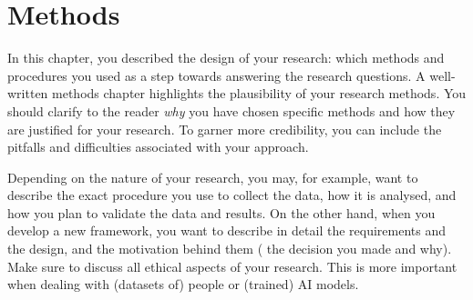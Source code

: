 \chapter{Methods}%
\label{ch:methods}
In this chapter, you described the design of your research: which methods and procedures you used as a step towards answering the research questions.
A well-written methods chapter highlights the plausibility of your research methods.
You should clarify to the reader \emph{why} you have chosen specific methods and how they are justified for your research.
To garner more credibility, you can include the pitfalls and difficulties associated with your approach.

Depending on the nature of your research, you may, for example, want to describe the exact procedure you use to collect the data, how it is analysed, and how you plan to validate the data and results. 
On the other hand, when you develop a new framework, you want to describe in detail the requirements and the design, and the motivation behind them (\ie{} the decision you made and why).
Make sure to discuss all ethical aspects of your research.
This is more important when dealing with (datasets of) people or (trained) AI models.